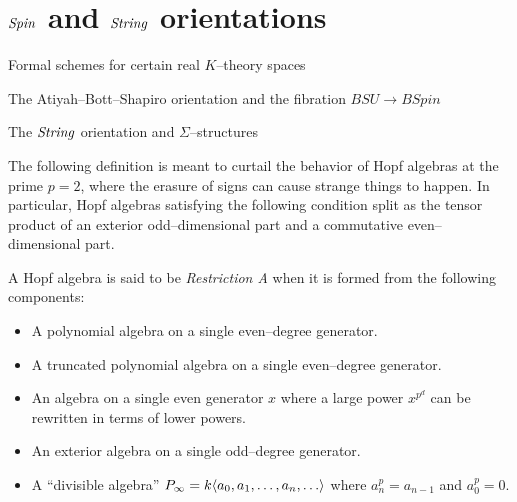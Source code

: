 












\section{$\mathit{Spin}$ and $\mathit{String}$ orientations}

Formal schemes for certain real $K$--theory spaces

The Atiyah--Bott--Shapiro orientation and the fibration $BSU \to BSpin$ 

The $\mathit{String}$ orientation and $\Sigma$--structures




The following definition is meant to curtail the behavior of Hopf algebras at the prime $p = 2$, where the erasure of signs can cause strange things to happen.  In particular, Hopf algebras satisfying the following condition split as the tensor product of an exterior odd--dimensional part and a commutative even--dimensional part.

\begin{definition}
A Hopf algebra is said to be \textit{Restriction A} when it is formed from the following components:
\begin{itemize}
\item A polynomial algebra on a single even--degree generator.
\item A truncated polynomial algebra on a single even--degree generator.
\item An algebra on a single even generator $x$ where a large power $x^{p^d}$ can be rewritten in terms of lower powers.
\item An exterior algebra on a single odd--degree generator.
\item A ``divisible algebra'' $P_\infty = k\langle a_0, a_1, \ldots, a_n, \ldots\rangle$ where $a_n^p = a_{n-1}$ and $a_0^p = 0$. 
\end{itemize}
\end{definition}

